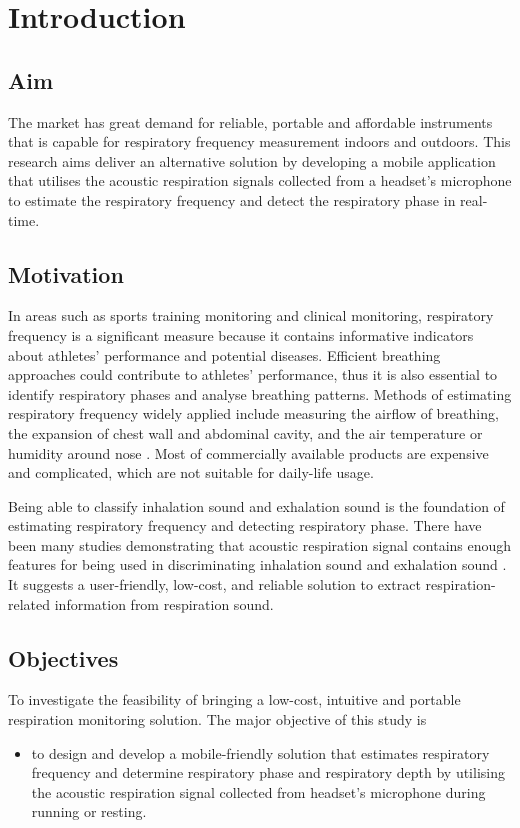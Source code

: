 \chapter{Introduction}
\section{Aim}
The market has great demand for reliable, portable and affordable instruments that is capable for respiratory frequency measurement indoors and outdoors. This research aims deliver an alternative solution by developing a mobile application that utilises the acoustic respiration signals collected from a headset’s microphone to estimate the respiratory frequency and detect the respiratory phase in real-time. 

\section{Motivation}
In areas such as sports training monitoring and clinical monitoring, respiratory frequency is a significant measure because it contains informative indicators about athletes' performance and potential diseases. Efficient breathing approaches could contribute to athletes' performance, thus it is also essential to identify respiratory phases and analyse breathing patterns. Methods of estimating respiratory frequency widely applied include measuring the airflow of breathing, the expansion of chest wall and abdominal cavity, and the air temperature or humidity around nose \cite{Massaroni2019Contact-BasedRate}. Most of commercially available products are expensive and complicated, which are not suitable for daily-life usage. 

Being able to classify inhalation sound and exhalation sound is the foundation of estimating respiratory frequency and detecting respiratory phase. There have been many studies demonstrating that acoustic respiration signal contains enough features for being used in discriminating inhalation sound and exhalation sound \cite{Hamke2019DetectingMachines}\cite{Kaur2017UseRespiration}\cite{Ren2015Fine-grainedSmartphones}. It suggests a user-friendly, low-cost, and reliable solution to extract respiration-related information from respiration sound. 

\section{Objectives}
To investigate the feasibility of bringing a low-cost, intuitive and portable respiration monitoring solution. The major objective of this study is
\begin{itemize}
\item to design and develop a mobile-friendly solution that estimates respiratory frequency and determine respiratory phase and respiratory depth by utilising the acoustic respiration signal collected from headset’s microphone during running or resting.
\end{itemize}

